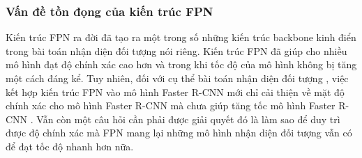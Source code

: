 {    \subsubsection{Vấn đề tồn đọng của kiến trúc FPN}
    Kiến trúc FPN ra đời đã tạo ra một trong số những kiến trúc backbone  kinh điển trong bài toán nhận diện đối tượng  nói riêng.
    Kiến trúc FPN đã giúp cho nhiều mô hình đạt độ chính xác cao hơn và trong khi tốc độ của mô hình không bị tăng một cách đáng kể.
    Tuy nhiên, đối với cụ thể bài toán nhận diện đối tượng , việc kết hợp kiến trúc FPN vào mô hình Faster R-CNN  mới chỉ cải thiện về mặt độ chính xác cho mô hình Faster R-CNN  mà chưa giúp tăng tốc mô hình Faster R-CNN .
    Vẫn còn một câu hỏi cần phải được giải quyết đó là làm sao để duy trì được độ chính xác mà FPN mang lại những mô hình nhận diện đối tượng  vẫn có để đạt tốc độ nhanh hơn nữa.
}